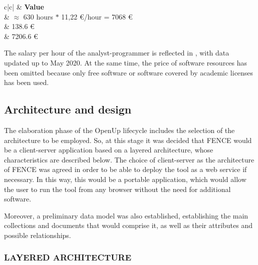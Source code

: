 \begin{table}
	\centering
	\caption{Project cost estimation}
	\label{tb:costs}
	\begin{tabular}{c|c|}
	\hline
	   & \textbf{Value}                      \\ \hline\hline
	 & $\approx$ 630 hours $*$ 11,22 €/hour = 7068 € \\ \hline
	 & 138.6   € \\ \hline
	                                          & 7206.6   €                          \\  
	\end{tabular}%
	
\end{table}

The salary per hour of the analyst-programmer is reflected in \cite{tecnoempleo}, with data updated up to May 2020. At the same time, the price of software resources has been omitted because only free software or software covered by academic licenses has been used.

\subsection{Architecture and design}

The elaboration phase of the OpenUp lifecycle includes the selection of the architecture to be employed. So, at this stage it was decided that FENCE would be a client-server application based on a layered architecture, whose characteristics are described below. The choice of client-server as the architecture of FENCE was agreed in order to be able to deploy the tool as a web service if necessary. In this way, this would be a portable application, which would allow the user to run the tool from any browser without the need for additional software.

Moreover, a preliminary data model was also established, establishing the main collections and documents that would comprise it, as well as their attributes and possible relationships.

\subsubsection{LAYERED ARCHITECTURE}

